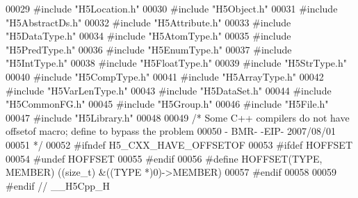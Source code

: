 \begin{DoxyCode}
00029 \textcolor{preprocessor}{#include "H5Location.h"}
00030 \textcolor{preprocessor}{#include "H5Object.h"}
00031 \textcolor{preprocessor}{#include "H5AbstractDs.h"}
00032 \textcolor{preprocessor}{#include "H5Attribute.h"}
00033 \textcolor{preprocessor}{#include "H5DataType.h"}
00034 \textcolor{preprocessor}{#include "H5AtomType.h"}
00035 \textcolor{preprocessor}{#include "H5PredType.h"}
00036 \textcolor{preprocessor}{#include "H5EnumType.h"}
00037 \textcolor{preprocessor}{#include "H5IntType.h"}
00038 \textcolor{preprocessor}{#include "H5FloatType.h"}
00039 \textcolor{preprocessor}{#include "H5StrType.h"}
00040 \textcolor{preprocessor}{#include "H5CompType.h"}
00041 \textcolor{preprocessor}{#include "H5ArrayType.h"}
00042 \textcolor{preprocessor}{#include "H5VarLenType.h"}
00043 \textcolor{preprocessor}{#include "H5DataSet.h"}
00044 \textcolor{preprocessor}{#include "H5CommonFG.h"}
00045 \textcolor{preprocessor}{#include "H5Group.h"}
00046 \textcolor{preprocessor}{#include "H5File.h"}
00047 \textcolor{preprocessor}{#include "H5Library.h"}
00048 
00049 \textcolor{comment}{/* Some C++ compilers do not have offsetof macro; define to bypass the problem}
00050 \textcolor{comment}{   - BMR- -EIP- 2007/08/01}
00051 \textcolor{comment}{*/}
00052 \textcolor{preprocessor}{#ifndef H5\_CXX\_HAVE\_OFFSETOF}
00053 \textcolor{preprocessor}{#ifdef HOFFSET}
00054 \textcolor{preprocessor}{   #undef HOFFSET}
00055 \textcolor{preprocessor}{#endif}
00056 \textcolor{preprocessor}{#define HOFFSET(TYPE, MEMBER) ((size\_t) &((TYPE *)0)->MEMBER)}
00057 \textcolor{preprocessor}{#endif}
00058 
00059 \textcolor{preprocessor}{#endif // \_\_H5Cpp\_H}
\end{DoxyCode}
